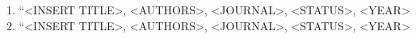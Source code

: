 


\begin{cvskills}

\cvskill
{1.}
{``<INSERT TITLE>, <AUTHORS>, <JOURNAL>, <STATUS>, <YEAR> }
\cvskill
{2.}
{``<INSERT TITLE>, <AUTHORS>, <JOURNAL>, <STATUS>, <YEAR> }
\end{cvskills}